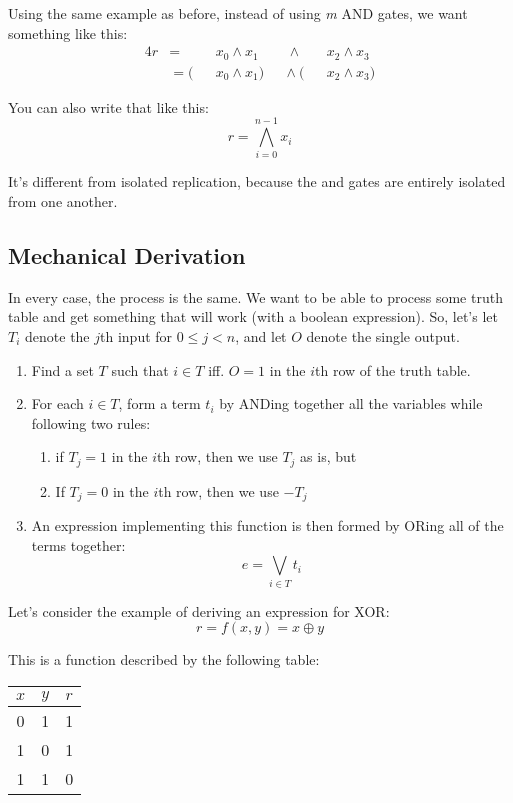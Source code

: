 \documentclass[11pt,a4paper,titlepage,dvipsnames,cmyk]{scrartcl}
\begin{document}
Using the same example as before, instead of using \textit{m} AND gates,
we want something like this:
\begin{alignat*}{4}
    r &= & &x_0 \wedge x_1   &&\ \wedge \ & &x_2 \wedge x_3 \\
      &= (& &x_0 \wedge x_1) &&\wedge \ (& &x_2 \wedge x_3)
\end{alignat*}

You can also write that like this:
\begin{equation*}
    r = \bigwedge^{n-1}_{i=0} x_i
\end{equation*}

It's different from isolated replication, because the and gates are
entirely isolated from one another.

\subsection{Mechanical Derivation}%
\label{sub:mechanical}
In every case, the process is the same. We want to be able to process some
truth table and get something that will work (with a boolean expression).
So, let's let $T_i$ denote the $j$th input for $0 \le j < n$, and let $O$
denote the single output.

\begin{enumerate}
    \item Find a set $T$ such that $i \in T$ iff. $O = 1$ in the $i$th row
        of the truth table.
    \item For each $i \in T$, form a term $t_i$ by ANDing together all the
        variables while following two rules:
        \begin{enumerate}
            \item if $T_j = 1$ in the $i$th row, then we use $T_j$ as is,
                but
            \item If $T_j = 0$ in the $i$th row, then we use $-T_j$
        \end{enumerate}
    \item An expression implementing this function is then formed by ORing
        all of the terms together:
        \begin{equation*}
            e = \bigvee_{i \in T} t_i
        \end{equation*}
\end{enumerate}

Let's consider the example of deriving an expression for XOR:
\begin{equation*}
    r = f(x,y) = x \oplus y
\end{equation*}

This is a function described by the following table:
\begin{center}
    \begin{tabular}{|c c|c|}
        \hline
        $x$ & $y$ & $r$ \\
        \hline
        0 & 1 & 1 \\
        \hline
        1 & 0 & 1 \\
        \hline
        1 & 1 & 0 \\
        \hline
    \end{tabular}
\end{center}
\end{document}
